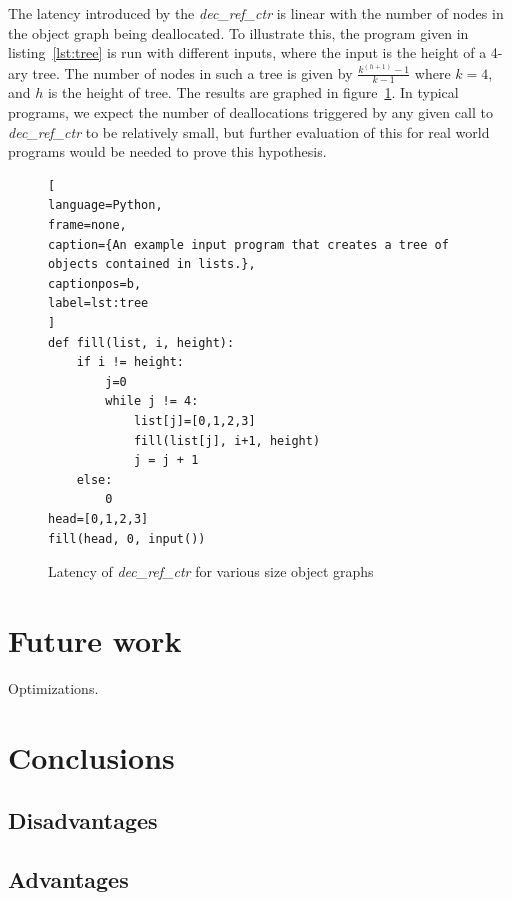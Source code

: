 \documentclass{sigplanconf}
\begin{document}
The latency introduced by the \textit{dec\_ref\_ctr} is linear with the number of nodes in the object graph being deallocated.  To illustrate this, the program given in listing~\ref{lst:tree} is run with different inputs, where the input is the height of a 4-ary tree.  The number of nodes in such a tree is given by $\frac{{k}^{\left(h+1\right)}-1}{k-1}$ where $k=4$, and $h$ is the height of tree.  The results are graphed in figure~\ref{fig:treelatency}.  In typical programs, we expect the number of deallocations triggered by any given call to \textit{dec\_ref\_ctr} to be relatively small, but further evaluation of this for real world programs would be needed to prove this hypothesis.

\begin{figure}[h!]
\begin{lstlisting}[
language=Python,
frame=none,
caption={An example input program that creates a tree of objects contained in lists.},
captionpos=b,
label=lst:tree
]
def fill(list, i, height):
    if i != height:
        j=0
        while j != 4:
            list[j]=[0,1,2,3]
            fill(list[j], i+1, height)
            j = j + 1
    else:
        0
head=[0,1,2,3]
fill(head, 0, input())
\end{lstlisting}
\end{figure}

\begin{figure}
\normalsize %

\caption{Latency of \textit{dec\_ref\_ctr} for various size object graphs}
\label{fig:treelatency}
\end{figure}

\section{Future work}
\label{sec:future}

Optimizations.

\section{Conclusions}
\label{sec:conclusion}

\subsection{Disadvantages}

\subsection{Advantages}
\end{document}

